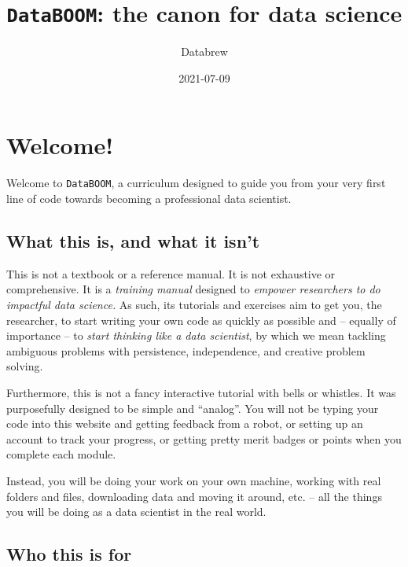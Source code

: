 \documentclass[
]{book}
\title{\texttt{DataBOOM}: the canon for data science}
\author{Databrew}
\date{2021-07-09}
\begin{document}
\maketitle

{
\setcounter{tocdepth}{1}
\tableofcontents
}
\hypertarget{welcome}{%
\chapter{Welcome!}\label{welcome}}

Welcome to \texttt{DataBOOM}, a curriculum designed to guide you from your very first line of code towards becoming a professional data scientist.

\hypertarget{what-this-is-and-what-it-isnt}{%
\section*{What this is, and what it isn't}\label{what-this-is-and-what-it-isnt}}

This is not a textbook or a reference manual. It is not exhaustive or comprehensive. It is a \emph{training manual} designed to \emph{empower researchers to do impactful data science.} As such, its tutorials and exercises aim to get you, the researcher, to start writing your own code as quickly as possible and -- equally of importance -- to \emph{start thinking like a data scientist}, by which we mean tackling ambiguous problems with persistence, independence, and creative problem solving.

Furthermore, this is not a fancy interactive tutorial with bells or whistles. It was purposefully designed to be simple and ``analog''. You will not be typing your code into this website and getting feedback from a robot, or setting up an account to track your progress, or getting pretty merit badges or points when you complete each module.

Instead, you will be doing your work on your own machine, working with real folders and files, downloading data and moving it around, etc. -- all the things you will be doing as a data scientist in the real world.

\hypertarget{who-this-is-for}{%
\section*{Who this is for}\label{who-this-is-for}}
\end{document}
